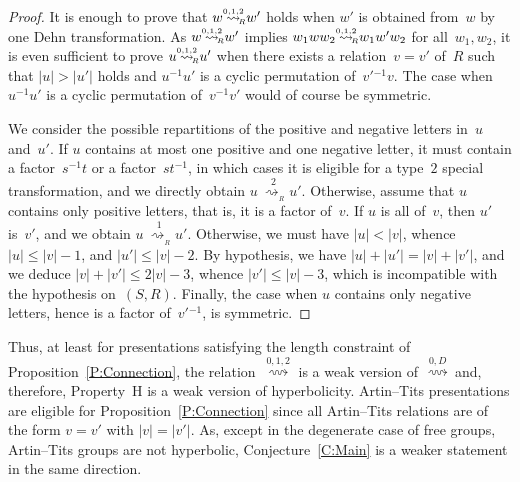 \documentclass{amsart}
\numberwithin{equation}{section}
\theoremstyle{plain}
\theoremstyle{definition}
\let\le=\leqslant
\begin{document}
\begin{proof} 
It is enough to prove that ${w} {\mathrel{{\mathrel{\overset{\scriptscriptstyle 0,1,2}{\rightsquigarrow}}}_{\hspace{-0.9ex}{\scriptscriptstyle R}}}} {w}'$ holds when ${w}'$ is obtained from~${w}$ by one Dehn transformation. As ${w} {\mathrel{{\mathrel{\overset{\scriptscriptstyle 0,1,2}{\rightsquigarrow}}}_{\hspace{-0.9ex}{\scriptscriptstyle R}}}} {w}'$ implies ${w}_1 {w} {w}_2 {\mathrel{{\mathrel{\overset{\scriptscriptstyle 0,1,2}{\rightsquigarrow}}}_{\hspace{-0.9ex}{\scriptscriptstyle R}}}} {w}_1 {w}' {w}_2$ for all~${w}_1, {w}_2$, it is even sufficient to prove ${u} {\mathrel{{\mathrel{\overset{\scriptscriptstyle 0,1,2}{\rightsquigarrow}}}_{\hspace{-0.9ex}{\scriptscriptstyle R}}}} {u}'$ when there exists a relation~${v} = {v}'$ of~${R}$ such that ${\vert{u}\vert} > {\vert{{u}'}\vert}$ holds and ${u}{^{-1}} {u}'$ is a cyclic permutation of~${v}'{}{^{-1}} {v}$. The case when ${u}{^{-1}} {u}'$ is a cyclic permutation of~${v}{^{-1}} {v}'$ would of course be symmetric. 

We consider the possible repartitions of the positive and negative letters in~${u}$ and~${u}'$. If ${u}$ contains at most one positive and one negative letter, it must contain a factor~${s}{^{-1}} {t}$ or a factor~${s} {t}{^{-1}}$, in which cases it is eligible for a type~$2$ special transformation, and we directly obtain ${u} {\mathrel{\overset{2}{\ \rightsquigarrow_{{\!{}_{R}}}}}} {u}'$. Otherwise, assume that ${u}$ contains only positive letters, that is, it is a factor of~${v}$. If ${u}$ is all of~${v}$, then ${u}'$ is~${v}'$, and we obtain ${u} {\mathrel{\overset{1}{\ \rightsquigarrow_{{\!{}_{R}}}}}} {u}'$. Otherwise, we must have ${\vert{u}\vert} < {\vert{v}\vert}$, whence ${\vert{u}\vert} \le {\vert{v}\vert} - 1$, and ${\vert{{u}'}\vert} \le {\vert{v}\vert} - 2$. By hypothesis, we have ${\vert{u}\vert} + {\vert{{u}'}\vert} = {\vert{v}\vert} + {\vert{{v}'}\vert}$, and we deduce ${\vert{v}\vert} + {\vert{{v}'}\vert} \le 2{\vert{v}\vert} -3$, whence ${\vert{{v}'}\vert} \le {\vert{v}\vert}-3$, which is incompatible with the hypothesis on~$({S}, {R})$. Finally, the case when ${u}$ contains only negative letters, hence is a factor of~${v}'{}{^{-1}}$, is symmetric.
\end{proof}

Thus, at least for presentations satisfying the length constraint of Proposition~\ref{P:Connection}, the relation~${\mathrel{\overset{\scriptscriptstyle 0,1,2}{\rightsquigarrow}}}$ is a weak version of~${\mathrel{\overset{\scriptscriptstyle 0,D}{\rightsquigarrow}}}$ and, therefore, Property~${\mathrm{H}}$ is a weak version of hyperbolicity. Artin--Tits presentations are eligible for Proposition~\ref{P:Connection} since all Artin--Tits relations are of the form ${v} = {v}'$ with ${\vert{v}\vert} = {\vert{{v}'}\vert}$. As, except in the degenerate case of free groups, Artin--Tits groups are not hyperbolic, Conjecture~\ref{C:Main} is a weaker statement in the same direction.
\end{document}
